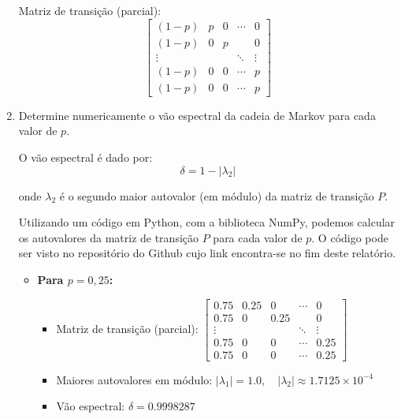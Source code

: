 \begin{enumerate}
\begin{resposta}
        Matriz de transição (parcial):
                $$
                \begin{bmatrix}
                    (1-p) & p & 0    & \cdots & 0 \\
                    (1-p) & 0    & p &        & 0 \\
                \vdots &     &     & \ddots & \vdots \\
                (1-p) & 0    & 0    & \cdots & p\\
                (1-p) & 0    & 0    & \cdots & p
                \end{bmatrix}
                $$

    \end{resposta}
    \item Determine numericamente o vão espectral da cadeia de Markov para cada valor de $p$.
    \begin{resposta}

        O vão espectral é dado por:
        $$\delta = 1 - |\lambda_2| $$
        
            onde $\lambda_2$ é o segundo maior autovalor (em módulo) da matriz de transição $P$.

        Utilizando um código em Python, com a biblioteca NumPy, podemos calcular os autovalores da matriz de transição $P$ para cada valor de $p$. O código pode ser visto no repositório do Github cujo link encontra-se no fim deste relatório.

        \begin{itemize}        
            \item \textbf{Para $p = 0{,}25$:}
            \begin{itemize}
                \item Matriz de transição (parcial):
                $
                \begin{bmatrix}
                0.75 & 0.25 & 0    & \cdots & 0 \\
                0.75 & 0    & 0.25 &        & 0 \\
                \vdots &     &     & \ddots & \vdots \\
                0.75 & 0    & 0    & \cdots & 0.25 \\
                0.75 & 0    & 0    & \cdots & 0.25
                \end{bmatrix}
                $
                \item Maiores autovalores em módulo:
                $ |\lambda_1| = 1.0, \quad |\lambda_2| \approx 1.7125 \times 10^{-4} $
                \item Vão espectral:
                $ \boxed{\delta = 0.9998287} $
            \end{itemize}
        

\end{itemize}
\end{resposta}
\end{enumerate}
